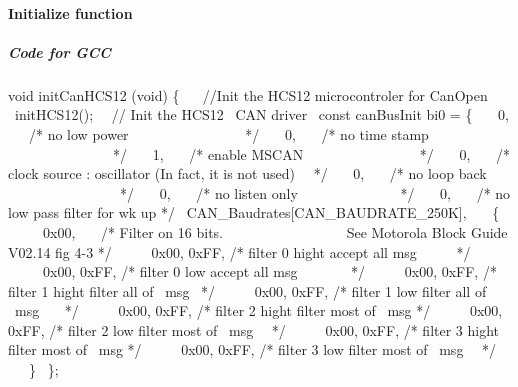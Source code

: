 \documentclass[12pt,twoside]{article}
\begin{document}
\paragraph{Initialize function}
\subparagraph{Code for GCC}
{\ttfamily
void initCanHCS12 (void)\newline
 \{ \ \newline
  \ //Init the HCS12 microcontroler for CanOpen \newline
  \ initHCS12();\newline
  \ \ // Init the HCS12 \ CAN driver\newline
  \ const canBusInit bi0 = \{\newline
  \ \ \ 0, \ \ \ /* no low power \ \ \ \ \ \ \ \ \ \ \ \ \ \ \ \ */
\newline
  \ \ \ 0, \ \ \ /* no time stamp
\ \ \ \ \ \ \ \ \ \ \ \ \ \ \ */\newline
  \ \ \ 1, \ \ \ /* enable MSCAN
\ \ \ \ \ \ \ \ \ \ \ \ \ \ \ \ */\newline
  \ \ \ 0, \ \ \ /* clock source : oscillator (In fact, it is not used)
\ \ */\newline
  \ \ \ 0, \ \ \ /* no loop back
\ \ \ \ \ \ \ \ \ \ \ \ \ \ \ \ */\newline
  \ \ \ 0, \ \ \ /* no listen only
\ \ \ \ \ \ \ \ \ \ \ \ \ \ */\newline
  \ \ \ 0, \ \ \ /* no low pass filter for wk up */\newline
  \ CAN\_Baudrates[CAN\_BAUDRATE\_250K],\newline
  \ \ \ \{\newline
  \ \ \ \ \ 0x00, \ \ \ /* Filter on 16 bits.\newline
  \ \ \ \ \ \ \ \ \ \ \ \ \ \ \ \ \ See Motorola Block Guide V02.14 fig
4{}-3 */\newline
  \ \ \ \ \ 0x00, 0xFF, /* filter 0 hight accept all msg
\ \ \ \ \ */\newline
  \ \ \ \ \ 0x00, 0xFF, /* filter 0 low accept all msg
\ \ \ \ \ \ \ */\newline
  \ \ \ \ \ 0x00, 0xFF, /* filter 1 hight filter all of \ msg
\ */\newline
  \ \ \ \ \ 0x00, 0xFF, /* filter 1 low filter all of \ msg
\ \ \ */\newline
  \ \ \ \ \ 0x00, 0xFF, /* filter 2 hight filter most of \ msg
*/\newline
  \ \ \ \ \ 0x00, 0xFF, /* filter 2 low filter most of \ msg
\ \ */\newline
  \ \ \ \ \ 0x00, 0xFF, /* filter 3 hight filter most of \ msg
*/\newline
  \ \ \ \ \ 0x00, 0xFF, /* filter 3 low filter most of \ msg
\ \ */\newline
  \ \ \ \}\newline
  \ \};}
\end{document}
